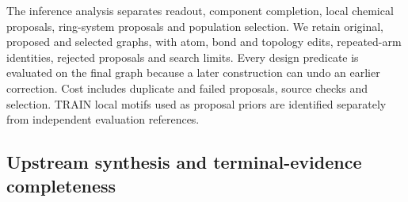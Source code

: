 The inference analysis separates readout, component completion, local chemical proposals, ring-system
proposals and population selection. We retain original, proposed and selected graphs, with atom,
bond and topology edits, repeated-arm identities, rejected proposals and search limits. Every design
predicate is evaluated on the final graph because a later construction can undo an earlier correction.
Cost includes duplicate and failed proposals, source checks and selection. TRAIN local motifs used
as proposal priors are identified separately from independent evaluation references.



\subsection{Upstream synthesis and terminal-evidence completeness}
